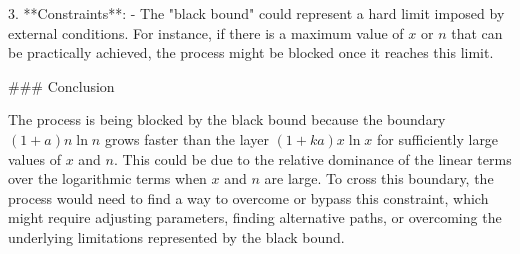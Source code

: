 3. **Constraints**:
   - The "black bound" could represent a hard limit imposed by external conditions. For instance, if there is a maximum value of \(x\) or \(n\) that can be practically achieved, the process might be blocked once it reaches this limit.

### Conclusion

The process is being blocked by the black bound because the boundary \((1 + a)n \ln n\) grows faster than the layer \((1 + ka)x \ln x\) for sufficiently large values of \(x\) and \(n\). This could be due to the relative dominance of the linear terms over the logarithmic terms when \(x\) and \(n\) are large. To cross this boundary, the process would need to find a way to overcome or bypass this constraint, which might require adjusting parameters, finding alternative paths, or overcoming the underlying limitations represented by the black bound.